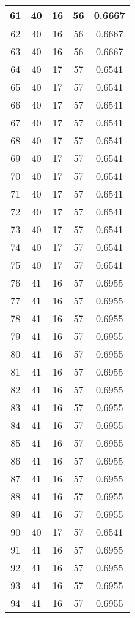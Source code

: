 \documentclass[letterpaper, 12pt]{article}
\begin{document}
\begin{longtable}{|c|c|c|c|c|}
\hline
61 & 40 & 16 & 56 & 0.6667 \\
\hline
62 & 40 & 16 & 56 & 0.6667 \\
\hline
63 & 40 & 16 & 56 & 0.6667 \\
\hline
64 & 40 & 17 & 57 & 0.6541 \\
\hline
65 & 40 & 17 & 57 & 0.6541 \\
\hline
66 & 40 & 17 & 57 & 0.6541 \\
\hline
67 & 40 & 17 & 57 & 0.6541 \\
\hline
68 & 40 & 17 & 57 & 0.6541 \\
\hline
69 & 40 & 17 & 57 & 0.6541 \\
\hline
70 & 40 & 17 & 57 & 0.6541 \\
\hline
71 & 40 & 17 & 57 & 0.6541 \\
\hline
72 & 40 & 17 & 57 & 0.6541 \\
\hline
73 & 40 & 17 & 57 & 0.6541 \\
\hline
74 & 40 & 17 & 57 & 0.6541 \\
\hline
75 & 40 & 17 & 57 & 0.6541 \\
\hline
76 & 41 & 16 & 57 & 0.6955 \\
\hline
77 & 41 & 16 & 57 & 0.6955 \\
\hline
78 & 41 & 16 & 57 & 0.6955 \\
\hline
79 & 41 & 16 & 57 & 0.6955 \\
\hline
80 & 41 & 16 & 57 & 0.6955 \\
\hline
81 & 41 & 16 & 57 & 0.6955 \\
\hline
82 & 41 & 16 & 57 & 0.6955 \\
\hline
83 & 41 & 16 & 57 & 0.6955 \\
\hline
84 & 41 & 16 & 57 & 0.6955 \\
\hline
85 & 41 & 16 & 57 & 0.6955 \\
\hline
86 & 41 & 16 & 57 & 0.6955 \\
\hline
87 & 41 & 16 & 57 & 0.6955 \\
\hline
88 & 41 & 16 & 57 & 0.6955 \\
\hline
89 & 41 & 16 & 57 & 0.6955 \\
\hline
90 & 40 & 17 & 57 & 0.6541 \\
\hline
91 & 41 & 16 & 57 & 0.6955 \\
\hline
92 & 41 & 16 & 57 & 0.6955 \\
\hline
93 & 41 & 16 & 57 & 0.6955 \\
\hline
94 & 41 & 16 & 57 & 0.6955 \\

\end{longtable}
\end{document}
